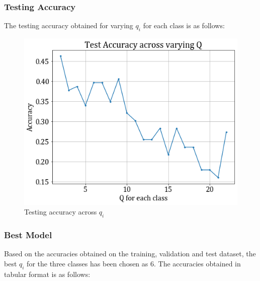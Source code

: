 \documentclass[11pt,a4paper]{article}
\begin{document}
\subsubsection{Testing Accuracy}
The testing accuracy obtained for varying $q_i$ for each class is as follows:
\begin{figure}[H]
    \centering
    \includegraphics[scale=0.5]{images/2a_full_test_acc.png}
    \caption{Testing accuracy across $q_i$}
\end{figure}

\subsubsection{Best Model}
Based on the accuracies obtained on the training, validation and test dataset, the best $q_i$ for the three classes has been chosen as $6$. The accuracies obtained in tabular format is as follows:

\end{document}
